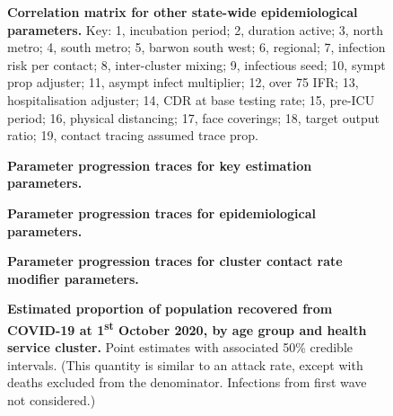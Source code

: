 \begin{figure}[ht]
    \caption{\textbf{Correlation matrix for other state-wide epidemiological parameters.} Key: 1, incubation period; 2, duration active; 3, north metro; 4, south metro; 5, barwon south west; 6, regional; 7, infection risk per contact; 8, inter-cluster mixing; 9, infectious seed; 10, sympt prop adjuster; 11, asympt infect multiplier; 12, over 75 IFR; 13, hospitalisation adjuster; 14, CDR at base testing rate; 15, pre-ICU period; 16, physical distancing; 17, face coverings; 18, target output ratio; 19, contact tracing assumed trace prop.}
\end{figure}

\begin{figure}[ht]
    \caption{\textbf{Parameter progression traces for key estimation parameters.}}
\end{figure}

\begin{figure}[ht]
    \caption{\textbf{Parameter progression traces for epidemiological parameters.}}
\end{figure}

\begin{figure}[ht]
    \caption{\textbf{Parameter progression traces for cluster contact rate modifier parameters.}}
\end{figure}

\begin{figure}[ht]
    \caption{\textbf{Estimated proportion of population recovered from COVID-19 at 1\textsuperscript{st} October 2020, by age group and health service cluster.} Point estimates with associated 50\% credible intervals. (This quantity is similar to an attack rate, except with deaths excluded from the denominator. Infections from first wave not considered.)}
\end{figure}
